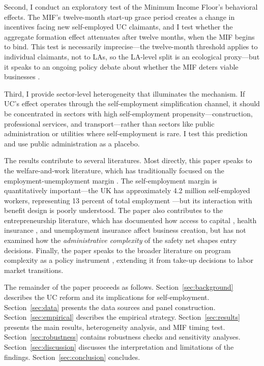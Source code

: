 \documentclass[12pt]{article}
\begin{document}
Second, I conduct an exploratory test of the Minimum Income Floor's behavioral effects. The MIF's twelve-month start-up grace period creates a change in incentives facing new self-employed UC claimants, and I test whether the aggregate formation effect attenuates after twelve months, when the MIF begins to bind. This test is necessarily imprecise---the twelve-month threshold applies to individual claimants, not to LAs, so the LA-level split is an ecological proxy---but it speaks to an ongoing policy debate about whether the MIF deters viable businesses \citep{griffiths2024going}.

Third, I provide sector-level heterogeneity that illuminates the mechanism. If UC's effect operates through the self-employment simplification channel, it should be concentrated in sectors with high self-employment propensity---construction, professional services, and transport---rather than sectors like public administration or utilities where self-employment is rare. I test this prediction and use public administration as a placebo.

The results contribute to several literatures. Most directly, this paper speaks to the welfare-and-work literature, which has traditionally focused on the employment-unemployment margin \citep{moffitt2002welfare, blundell2006earned}. The self-employment margin is quantitatively important---the UK has approximately 4.2 million self-employed workers, representing 13 percent of total employment \citep{ons2019selfemployment}---but its interaction with benefit design is poorly understood. The paper also contributes to the entrepreneurship literature, which has documented how access to capital \citep{hurst2004liquidity}, health insurance \citep{fairlie2011entrepreneurship}, and unemployment insurance \citep{hombert2020can} affect business creation, but has not examined how the \textit{administrative complexity} of the safety net shapes entry decisions. Finally, the paper speaks to the broader literature on program complexity as a policy instrument \citep{bhargava2015psychological, finkelstein2019take}, extending it from take-up decisions to labor market transitions.

The remainder of the paper proceeds as follows. Section~\ref{sec:background} describes the UC reform and its implications for self-employment. Section~\ref{sec:data} presents the data sources and panel construction. Section~\ref{sec:empirical} describes the empirical strategy. Section~\ref{sec:results} presents the main results, heterogeneity analysis, and MIF timing test. Section~\ref{sec:robustness} contains robustness checks and sensitivity analyses. Section~\ref{sec:discussion} discusses the interpretation and limitations of the findings. Section~\ref{sec:conclusion} concludes.
\end{document}
